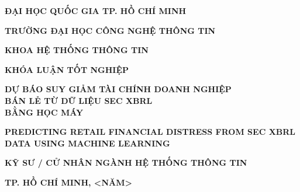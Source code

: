 \documentclass[13pt,a4paper]{extreport}
\begin{document}
\begin{titlepage}
\centering
{\bfseries\fontsize{14}{17}\selectfont ĐẠI HỌC QUỐC GIA TP. HỒ CHÍ MINH\par}
\vspace{4pt}
{\bfseries\fontsize{16}{19}\selectfont TRƯỜNG ĐẠI HỌC CÔNG NGHỆ THÔNG TIN\par}
\vspace{10pt}
{\bfseries\fontsize{14}{17}\selectfont KHOA HỆ THỐNG THÔNG TIN\par}
\vspace{1.8cm}
{\bfseries\fontsize{14}{17}\par}
\vspace{1.2cm}
{\bfseries\fontsize{16}{19}\selectfont KHÓA LUẬN TỐT NGHIỆP\par}
\vspace{1.0cm}
{\bfseries\fontsize{20}{24}\selectfont DỰ BÁO SUY GIẢM TÀI CHÍNH DOANH NGHIỆP\\[2pt] BÁN LẺ TỪ DỮ LIỆU SEC XBRL\\[2pt] BẰNG HỌC MÁY\par}
\vspace{0.6cm}
{\bfseries\fontsize{15}{18}\selectfont PREDICTING RETAIL FINANCIAL DISTRESS FROM SEC XBRL DATA USING MACHINE LEARNING\par}
\vfill
{\bfseries\fontsize{14}{17}\selectfont KỸ SƯ / CỬ NHÂN NGÀNH HỆ THỐNG THÔNG TIN\par}
\vspace{1.0cm}
{\bfseries\fontsize{13}{16}\selectfont TP. HỒ CHÍ MINH, <NĂM>\par}
\end{titlepage}
\end{document}

